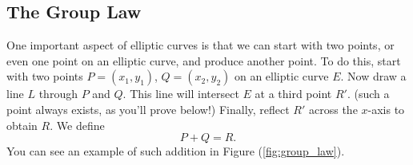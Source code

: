 \documentclass{article}
\begin{document}
\subsection*{The Group Law}
    One important aspect of elliptic curves is that we can start with two points, or even one point on an elliptic curve, and produce another point. To do this, start with two points $P = (x_{1}, y_{1})$, $Q = (x_{2}, y_{2})$ on an elliptic curve $E$. Now draw a line $L$ through $P$ and $Q$. This line will intersect $E$ at a third point $R'$. (such a point always exists, as you'll prove below!) Finally, reflect $R'$ across the $x$-axis to obtain $R$. We define $$P + Q = R.$$ You can see an example of such addition in Figure (\ref{fig:group_law}).

\begin{figure}[htbp]
    \centering
    

\end{figure}
\end{document}
